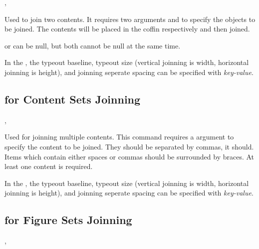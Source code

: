 \documentclass[full]{l3doc}
\begin{document}
\begin{documentation}
\begin{function}{\joinbox,\joinbox*}
\end{function}

  Used to join two contents. It requires two arguments  and
   to specify the objects to be joined. The contents will
  be placed in the coffin respectively and then joined.

   or  can be null, but both cannot be null at
  the same time.

  In the , the typeout baseline, typeout size
  (vertical joinning is width, horizontal joinning is height), and 
  joinning seperate spacing can be specified with \textit{key-value}.

\subsection{ for Content Sets Joinning}

\begin{function}{\joinboxes,\joinboxes*}
  \begin{syntax}
      
      
  \end{syntax}

\end{function}

  Used for joinning multiple contents. This command requires a
  argument to specify the content to be joined.
  They should be separated by commas, it should. Items which contain
  either spaces or commas should be surrounded by braces.
  At least one content is required.

  In the , the typeout baseline, typeout size
  (vertical joinning is width, horizontal joinning is height), and
  joinning seperate spacing can be specified with \textit{key-value}.

\subsection{ for Figure Sets Joinning}

\begin{function}{\joinfigs,\joinfigs*}
  \begin{syntax}
      
      
  \end{syntax}

\end{function}


\end{documentation}
\end{document}
